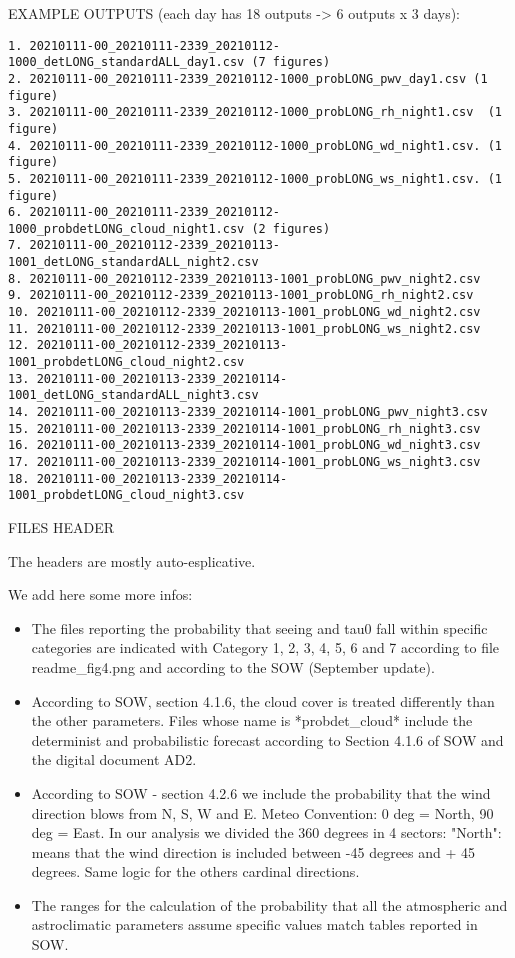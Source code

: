 EXAMPLE OUTPUTS (each day has 18 outputs -> 6 outputs x 3 days):
\begin{verbatim}
1. 20210111-00_20210111-2339_20210112-1000_detLONG_standardALL_day1.csv (7 figures)
2. 20210111-00_20210111-2339_20210112-1000_probLONG_pwv_day1.csv (1 figure)
3. 20210111-00_20210111-2339_20210112-1000_probLONG_rh_night1.csv  (1 figure)
4. 20210111-00_20210111-2339_20210112-1000_probLONG_wd_night1.csv. (1 figure)
5. 20210111-00_20210111-2339_20210112-1000_probLONG_ws_night1.csv. (1 figure)
6. 20210111-00_20210111-2339_20210112-1000_probdetLONG_cloud_night1.csv (2 figures)
7. 20210111-00_20210112-2339_20210113-1001_detLONG_standardALL_night2.csv
8. 20210111-00_20210112-2339_20210113-1001_probLONG_pwv_night2.csv
9. 20210111-00_20210112-2339_20210113-1001_probLONG_rh_night2.csv
10. 20210111-00_20210112-2339_20210113-1001_probLONG_wd_night2.csv
11. 20210111-00_20210112-2339_20210113-1001_probLONG_ws_night2.csv
12. 20210111-00_20210112-2339_20210113-1001_probdetLONG_cloud_night2.csv
13. 20210111-00_20210113-2339_20210114-1001_detLONG_standardALL_night3.csv
14. 20210111-00_20210113-2339_20210114-1001_probLONG_pwv_night3.csv
15. 20210111-00_20210113-2339_20210114-1001_probLONG_rh_night3.csv
16. 20210111-00_20210113-2339_20210114-1001_probLONG_wd_night3.csv
17. 20210111-00_20210113-2339_20210114-1001_probLONG_ws_night3.csv
18. 20210111-00_20210113-2339_20210114-1001_probdetLONG_cloud_night3.csv
\end{verbatim}

FILES HEADER

The headers are mostly auto-esplicative.

We add here some more infos:
\begin{itemize}
\item  The files reporting the probability that seeing and tau0 fall within specific categories are indicated with Category 1, 2, 3, 4, 5, 6 and 7 according to file readme\_fig4.png and according to the SOW (September update).
\item According to SOW, section 4.1.6, the cloud cover is treated differently than the other parameters. Files whose name is *probdet\_cloud* include the determinist and probabilistic forecast according to Section 4.1.6 of SOW and the digital document AD2.
\item According to SOW - section 4.2.6 we include the probability that the wind direction blows from N, S, W and E. Meteo Convention: 0 deg = North, 90 deg = East. In our analysis we divided the 360 degrees in 4 sectors: "North": means that the wind direction is included between -45 degrees and + 45 degrees. Same logic for the others cardinal directions.
\item  The ranges for the calculation of the probability that all the atmospheric and astroclimatic parameters assume specific values match tables reported in SOW.
\end{itemize}



